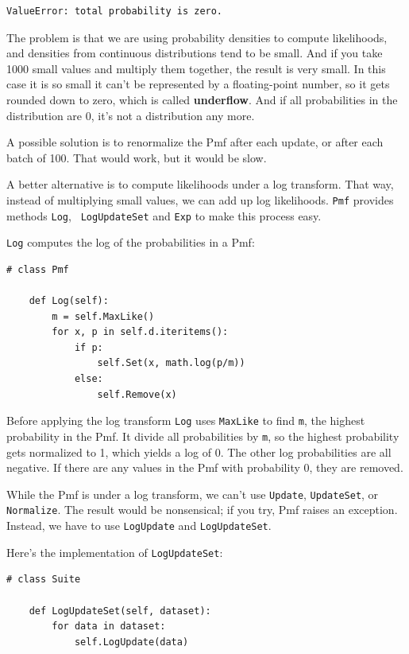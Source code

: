 \documentclass[12pt]{book}
\begin{document}
\begin{verbatim}
ValueError: total probability is zero.
\end{verbatim}

The problem is that we are using probability densities to compute
likelihoods, and densities from continuous distributions tend to be
small.  And if you take 1000 small values and multiply
them together, the result is very small.  In this case it is so small
it can't be represented by a floating-point number, so it gets rounded
down to zero, which is called {\bf underflow}.  And if all
probabilities in the distribution are 0, it's not a distribution any
more.

A possible solution is to renormalize the Pmf after each update,
or after each batch of 100.  That would work, but it would be slow.

A better alternative is to compute likelihoods under a log
transform.  That way, instead of multiplying small values, we can add
up log likelihoods.  {\tt Pmf} provides methods {\tt Log}, {\tt
  LogUpdateSet} and {\tt Exp} to make this process easy.

{\tt Log} computes the log of the probabilities in a Pmf:

\begin{verbatim}
# class Pmf

    def Log(self):
        m = self.MaxLike()
        for x, p in self.d.iteritems():
            if p:
                self.Set(x, math.log(p/m))
            else:
                self.Remove(x)
\end{verbatim}

Before applying the log transform {\tt Log} uses {\tt MaxLike} to find
{\tt m}, the highest probability in the Pmf.  It divide all
probabilities by {\tt m}, so the highest probability gets normalized
to 1, which yields a log of 0.  The other log probabilities are all
negative.  If there are any values in the Pmf with probability 0, they
are removed.

While the Pmf is under a log transform, we can't use {\tt Update},
{\tt UpdateSet}, or {\tt Normalize}.  The result would be nonsensical;
if you try, Pmf raises an exception.
Instead, we have to use {\tt LogUpdate}
and {\tt LogUpdateSet}.  

Here's the implementation of {\tt LogUpdateSet}:

\begin{verbatim}
# class Suite

    def LogUpdateSet(self, dataset):
        for data in dataset:
            self.LogUpdate(data)
\end{verbatim}
\end{document}
